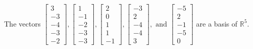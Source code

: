 \begin{exercise}
\begin{exerciseStatement}
  \end{exerciseStatement}
  \begin{exerciseAnswer}
   The vectors \(\left[\begin{array}{r}
3 \\
-3 \\
-4 \\
-3 \\
-2
\end{array}\right] , \left[\begin{array}{r}
1 \\
-1 \\
-2 \\
-3 \\
-3
\end{array}\right] , \left[\begin{array}{r}
2 \\
0 \\
1 \\
1 \\
-1
\end{array}\right] , \left[\begin{array}{r}
-3 \\
2 \\
-4 \\
-4 \\
3
\end{array}\right] , \text{ and } \left[\begin{array}{r}
-5 \\
2 \\
-1 \\
-5 \\
0
\end{array}\right]\) 
  	 are  a basis of \(\mathbb{R}^5\).
  


  \end{exerciseAnswer}
\end{exercise}